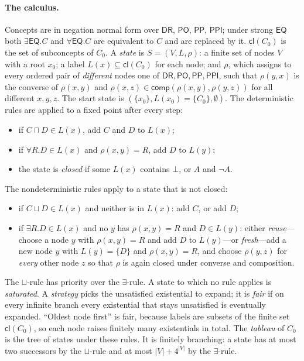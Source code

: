 \documentclass[11pt]{article}
\newcommand{\DR}{\mathsf{DR}}
\newcommand{\PO}{\mathsf{PO}}
\newcommand{\PP}{\mathsf{PP}}
\newcommand{\PPI}{\mathsf{PPI}}
\newcommand{\EQ}{\mathsf{EQ}}
\newcommand{\cl}{\ensuremath{\mathsf{cl}}}
\newcommand{\comp}{\ensuremath{\mathsf{comp}}}
\theoremstyle{plain}
\theoremstyle{definition}
\begin{document}
\paragraph{The calculus.} Concepts are in negation normal form over $\DR$,
$\PO$, $\PP$, $\PPI$; under strong $\EQ$ both $\exists\EQ.C$ and
$\forall\EQ.C$ are equivalent to $C$ and are replaced by it. $\cl(C_0)$ is the
set of subconcepts of $C_0$. A \emph{state} is $S=(V,L,\rho)$: a finite set of
nodes $V$ with a root $x_0$; a label $L(x)\subseteq\cl(C_0)$ for each node; and
$\rho$, which assigns to every ordered pair of \emph{different} nodes one of
$\DR,\PO,\PP,\PPI$, such that $\rho(y,x)$ is the converse of $\rho(x,y)$ and
$\rho(x,z)\in\comp(\rho(x,y),\rho(y,z))$ for all different $x,y,z$. The start
state is $(\{x_0\},L(x_0)=\{C_0\},\emptyset)$. The deterministic rules are
applied to a fixed point after every step:
\begin{itemize}\setlength\itemsep{0pt}
  \item[$\sqcap$] if $C\sqcap D\in L(x)$, add $C$ and $D$ to $L(x)$;
  \item[$\forall$] if $\forall R.D\in L(x)$ and $\rho(x,y)=R$, add $D$ to
    $L(y)$;
  \item[clash] the state is \emph{closed} if some $L(x)$ contains $\bot$, or
    $A$ and $\neg A$.
\end{itemize}
The nondeterministic rules apply to a state that is not closed:
\begin{itemize}\setlength\itemsep{0pt}
  \item[$\sqcup$] if $C\sqcup D\in L(x)$ and neither is in $L(x)$: add $C$, or
    add $D$;
  \item[$\exists$] if $\exists R.D\in L(x)$ and no $y$ has $\rho(x,y)=R$ and
    $D\in L(y)$: either \emph{reuse}---choose a node $y$ with $\rho(x,y)=R$
    and add $D$ to $L(y)$---or \emph{fresh}---add a new node $y$ with
    $L(y)=\{D\}$ and $\rho(x,y)=R$, and choose $\rho(y,z)$ for \emph{every}
    other node $z$ so that $\rho$ is again closed under converse and
    composition.
\end{itemize}
The $\sqcup$-rule has priority over the $\exists$-rule. A state to which no
rule applies is \emph{saturated}. A \emph{strategy} picks the unsatisfied
existential to expand; it is \emph{fair} if on every infinite branch every
existential that stays unsatisfied is eventually expanded. ``Oldest node
first'' is fair, because labels are subsets of the finite set $\cl(C_0)$, so
each node raises finitely many existentials in total. The \emph{tableau} of
$C_0$ is the tree of states under these rules. It is finitely branching: a
state has at most two successors by the $\sqcup$-rule and at most
$|V|+4^{|V|}$ by the $\exists$-rule.
\end{document}
